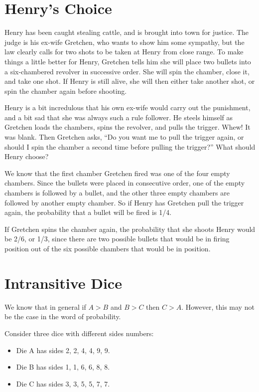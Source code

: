 \hypertarget{Henry-Choice}{%
  \section{Henry's Choice}\label{Henry-Choice}}

Henry has been caught stealing cattle, and is brought into town for justice. The
judge is his ex-wife Gretchen, who wants to show him some sympathy, but the law
clearly calls for two shots to be taken at Henry from close range. To make
things a little better for Henry, Gretchen tells him she will place two bullets
into a six-chambered revolver in successive order. She will spin the chamber,
close it, and take one shot. If Henry is still alive, she will then either take
another shot, or spin the chamber again before shooting.

Henry is a bit incredulous that his own ex-wife would carry out the punishment,
and a bit sad that she was always such a rule follower. He steels himself as
Gretchen loads the chambers, spins the revolver, and pulls the trigger. Whew! It
was blank. Then Gretchen asks, ``Do you want me to pull the trigger again, or
should I spin the chamber a second time before pulling the trigger?'' What
should Henry choose?

We know that the first chamber Gretchen fired was one of the four empty
chambers. Since the bullets were placed in consecutive order, one of the empty
chambers is followed by a bullet, and the other three empty chambers are
followed by another empty chamber. So if Henry has Gretchen pull the trigger
again, the probability that a bullet will be fired is 1/4.

If Gretchen spins the chamber again, the probability that she shoots Henry would
be 2/6, or 1/3, since there are two possible bullets that would be in firing
position out of the six possible chambers that would be in position.



\hypertarget{Intransitive-Dice}{%
  \section{Intransitive Dice}\label{Intransitive-Dice}}

We know that in general if $A>B$ and $B>C$ then $C>A$. However, this may not be
the case in the word of probability.

Consider three dice with different sides numbers:
\begin{itemize}
\item Die A has sides 2, 2, 4, 4, 9, 9.
\item Die B has sides 1, 1, 6, 6, 8, 8.
\item Die C has sides 3, 3, 5, 5, 7, 7.
\end{itemize}

